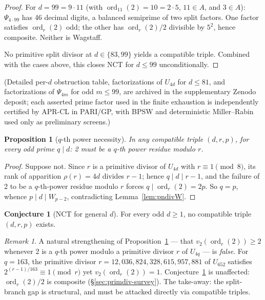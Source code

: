 \documentclass[11pt]{amsart}
\theoremstyle{plain}
\newtheorem{proposition}[theorem]{Proposition}
\theoremstyle{definition}
\newtheorem{conjecture}[theorem]{Conjecture}
\theoremstyle{remark}
\newtheorem{remark}[theorem]{Remark}
\numberwithin{equation}{section}
\newcommand{\ord}{\operatorname{ord}}
\begin{document}
\begin{proof}
For $d = 99 = 9 \cdot 11$ (with $\ord_{11}(2) = 10 = 2 \cdot 5$, $11 \in A$, and $3 \in A$): $\Psi_{4 \cdot 99}$ has 46 decimal digits, a balanced semiprime of two split factors. One factor satisfies $\ord_r(2)$ odd; the other has $\ord_r(2)/2$ divisible by $5^2$, hence composite. Neither is Wagstaff.

No primitive split divisor at $d \in \{83, 99\}$ yields a compatible triple. Combined with the cases above, this closes NCT for $d \leq 99$ unconditionally.
\end{proof}

(Detailed per-$d$ obstruction table, factorizations of $U_{4 d}$ for $d \leq 81$, and factorizations of $\Psi_{4 m}$ for odd $m \leq 99$, are archived in the supplementary Zenodo deposit; each asserted prime factor used in the finite exhaustion is independently certified by APR-CL in PARI/GP, with BPSW and deterministic Miller--Rabin used only as preliminary screens.)

\begin{proposition}[$q$-th power necessity]\label{prop:qth-power}
In any compatible triple $(d, r, p)$, for every odd prime $q \mid d$: 2 must be a $q$-th power residue modulo $r$.
\end{proposition}

\begin{proof}
Suppose not. Since $r$ is a primitive divisor of $U_{4d}$ with $r \equiv 1 \pmod 8$, its rank of apparition $\rho(r) = 4 d$ divides $r - 1$; hence $q \mid d \mid r - 1$, and the failure of 2 to be a $q$-th-power residue modulo $r$ forces $q \mid \ord_r(2) = 2 p$. So $q = p$, whence $p \mid d \mid W_{p-2}$, contradicting Lemma~\ref{lem:pndivW}.
\end{proof}

\begin{conjecture}[NCT for general $d$]\label{conj:nct-general}
For every odd $d \geq 1$, no compatible triple $(d, r, p)$ exists.
\end{conjecture}

\begin{remark}\label{rem:strengthening-false}
A natural strengthening of Proposition~\ref{prop:qth-power} --- that $v_2(\ord_r(2)) \geq 2$ whenever 2 is a $q$-th power modulo a primitive divisor $r$ of $U_{4 q}$ --- is \emph{false}. For $q = 163$, the primitive divisor $r = 12{,}036{,}824{,}328{,}615{,}957{,}881$ of $U_{652}$ satisfies $2^{(r-1)/163} \equiv 1 \pmod r$ yet $v_2(\ord_r(2)) = 1$. Conjecture~\ref{conj:nct-general} is unaffected: $\ord_r(2)/2$ is composite (\S\ref{sec:primdiv-survey}). The take-away: the split-branch gap is structural, and must be attacked directly via compatible triples.
\end{remark}
\end{document}
